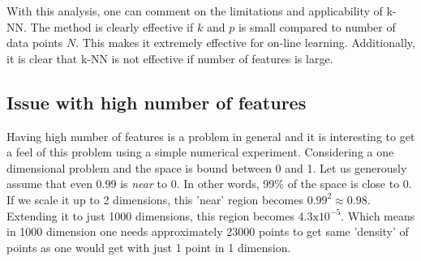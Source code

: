\documentclass{article}
\begin{document}
With this analysis, one can comment on the limitations and applicability of k-NN. The method is clearly effective if $k$ and $p$ is small compared to number of data points $N$. This makes it extremely effective for on-line learning. Additionally, it is clear that k-NN is not effective if number of features is large. 

\subsection{Issue with high number of features}
Having high number of features is a problem in general and it is interesting to get a feel of this problem using a simple numerical experiment. Considering a one dimensional problem and the space is bound between 0 and 1. Let us generously assume that even 0.99 is \textit{near} to 0. In other words, 99\% of the space is close to 0. If we scale it up to 2 dimensions, this 'near' region becomes $\mathrm{0.99^2} \approx \mathrm{0.98}$.  Extending it to just 1000 dimensions, this region becomes $\mathrm{4.3 x 10^{-5}}$. Which means in 1000 dimension one needs approximately 23000 points to get same 'density' of points as one would get with just 1 point in 1 dimension.
\end{document}
